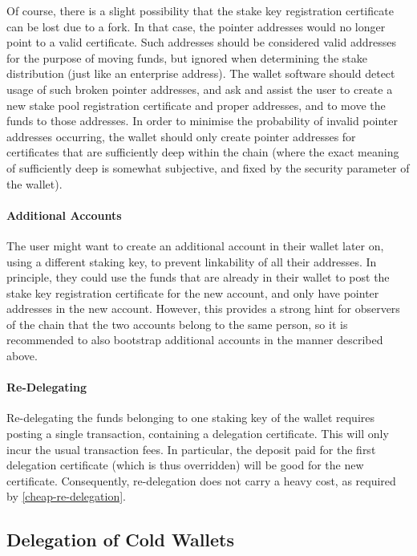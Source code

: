 \documentclass[11pt,a4paper]{article}
\begin{document}
Of course, there is a slight possibility that the stake key
registration certificate can be lost due to a fork. In that case, the
pointer addresses would no longer point to a valid certificate. Such
addresses should be considered valid addresses for the purpose of
moving funds, but ignored when determining the stake distribution
(just like an enterprise address). The wallet software should detect
usage of such broken pointer addresses, and ask and assist the user to
create a new stake pool registration certificate and proper addresses,
and to move the funds to those addresses. In order to minimise the
probability of invalid pointer addresses occurring, the wallet should
only create pointer addresses for certificates that are sufficiently
deep within the chain (where the exact meaning of sufficiently deep is
somewhat subjective, and fixed by the security parameter of the
wallet).

\paragraph{Additional Accounts}
The user might want to create an additional account in their wallet
later on, using a different staking key, to prevent linkability of all
their addresses. In principle, they could use the funds that are
already in their wallet to post the stake key registration certificate
for the new account, and only have pointer addresses in the new
account. However, this provides a strong hint for observers of the
chain that the two accounts belong to the same person, so it is
recommended to also bootstrap additional accounts in the manner
described above.

\paragraph{Re-Delegating}
Re-delegating the funds belonging to one staking key of the wallet
requires posting a single transaction, containing a delegation
certificate. This will only incur the usual transaction fees. In
particular, the deposit paid for the first delegation certificate
(which is thus overridden) will be good for the new
certificate. Consequently, re-delegation does not carry a heavy cost,
as required by \cref{cheap-re-delegation}.

\subsection{Delegation of Cold Wallets}
\label{delegation-of-cold-wallets}
\end{document}
